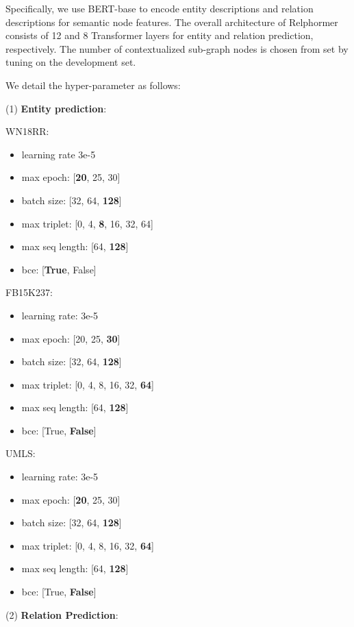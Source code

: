\documentclass[sigconf]{acmart}
\begin{document}
Specifically, we use BERT-base to encode entity descriptions and relation descriptions for semantic node features.
The overall architecture of Relphormer consists of 12 and 8 Transformer layers for entity and relation prediction, respectively. 
The number of contextualized sub-graph nodes is chosen from set  by tuning on the development set. 

We detail the hyper-parameter as follows:

(1) \textbf{Entity prediction}:

WN18RR:
\begin{itemize}
\item learning rate 3e-5
\item max epoch: 
[\textbf{20}, 25, 30]
\item batch size: [32, 64, \textbf{128}]
\item max triplet: [0, 4, \textbf{8}, 16, 32, 64]
\item max seq length: [64, \textbf{128}]
\item bce: [\textbf{True}, False]
\end{itemize}

FB15K237:
\begin{itemize}
\item learning rate: 3e-5
\item max epoch: 
[20, 25, \textbf{30}]
\item batch size: [32, 64, \textbf{128}]
\item max triplet: [0, 4, 8, 16, 32, \textbf{64}]
\item max seq length: [64, \textbf{128}]
\item bce: [True, \textbf{False}]
\end{itemize}

UMLS:
\begin{itemize}
\item learning rate: 3e-5
\item max epoch: 
[\textbf{20}, 25, 30]
\item batch size: [32, 64, \textbf{128}]
\item max triplet: [0, 4, 8, 16, 32, \textbf{64}]
\item max seq length: [64, \textbf{128}]
\item bce: [True, \textbf{False}]
\end{itemize}
(2) \textbf{Relation Prediction}:
\end{document}
